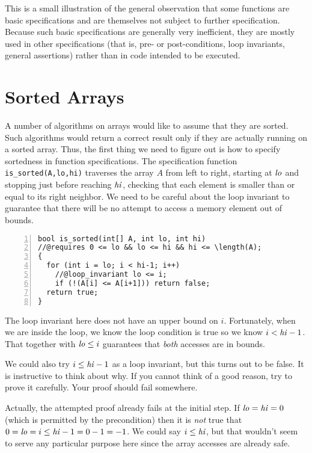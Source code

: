 This is a small illustration of the general observation that some
functions are basic specifications and are themselves not subject to
further specification.  Because such basic specifications are
generally very inefficient, they are mostly used in other
specifications (that is, pre- or post-conditions, loop invariants,
general assertions) rather than in code intended to be executed.

\section{Sorted Arrays}
\label{sec:linsearch:invariants}

A number of algorithms on arrays would like to assume that they are
sorted.  Such algorithms would return a correct result only if they
are actually running on a sorted array. Thus, the first thing we need
to figure out is how to specify sortedness in function specifications.
The specification function \lstinline'is_sorted(A,lo,hi)' traverses
the array $A$ from left to right, starting at ${\it lo}$ and stopping
just before reaching ${\it hi}$, checking that each element is smaller
than or equal to its right neighbor.  We need to be careful about the
loop invariant to guarantee that there will be no attempt to access a
memory element out of bounds.

\begin{lstlisting}[language={[C0]C}, numbers=left]
bool is_sorted(int[] A, int lo, int hi)
//@requires 0 <= lo && lo <= hi && hi <= \length(A);
{
  for (int i = lo; i < hi-1; i++)
    //@loop_invariant lo <= i;
    if (!(A[i] <= A[i+1])) return false;
  return true;
}
\end{lstlisting}
\noindent
The loop invariant here does not have an upper bound on $i$.
Fortunately, when we are inside the loop, we know the loop condition
is true so we know $i < {\it hi}-1$.  That together with ${\it
  lo} \leq i$ guarantees that \emph{both} accesses are in bounds.

We could also try $i \leq {\it hi}-1$ as a loop invariant, but this turns out
to be false.  It is instructive to think about why.  If you cannot
think of a good reason, try to prove it carefully.  Your proof should
fail somewhere.

Actually, the attempted proof already fails at the initial
step.  If ${\it lo} = {\it hi} = 0$
(which is permitted by the precondition)
then it is \emph{not} true that
$0 = {\it lo} = i \leq {\it hi}-1 = 0-1 = -1$.
We could say $i \leq {\it hi}$, but that wouldn't seem to serve
any particular purpose here since the array accesses are
already safe.

